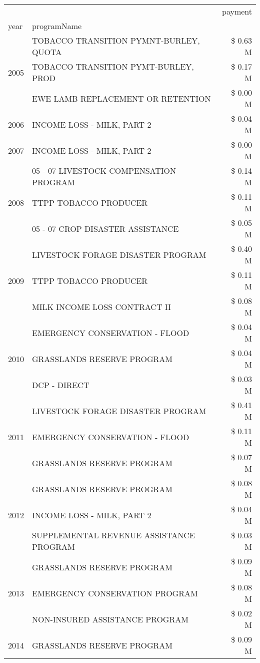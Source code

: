 \begin{tabular}{llr}
\toprule
 &  & payment \\
year & programName &  \\
\midrule
\multirow[t]{3}{*}{2005} & TOBACCO TRANSITION PYMNT-BURLEY, QUOTA & \$ 0.63 M \\
 & TOBACCO TRANSITION PYMT-BURLEY, PROD & \$ 0.17 M \\
 & EWE LAMB REPLACEMENT OR RETENTION & \$ 0.00 M \\
\cline{1-3}
2006 & INCOME LOSS - MILK, PART 2 & \$ 0.04 M \\
\cline{1-3}
2007 & INCOME LOSS - MILK, PART 2 & \$ 0.00 M \\
\cline{1-3}
\multirow[t]{3}{*}{2008} & 05 - 07 LIVESTOCK COMPENSATION PROGRAM & \$ 0.14 M \\
 & TTPP TOBACCO PRODUCER & \$ 0.11 M \\
 & 05 - 07 CROP DISASTER ASSISTANCE & \$ 0.05 M \\
\cline{1-3}
\multirow[t]{3}{*}{2009} & LIVESTOCK FORAGE DISASTER  PROGRAM & \$ 0.40 M \\
 & TTPP TOBACCO PRODUCER & \$ 0.11 M \\
 & MILK INCOME LOSS CONTRACT II & \$ 0.08 M \\
\cline{1-3}
\multirow[t]{3}{*}{2010} & EMERGENCY CONSERVATION - FLOOD & \$ 0.04 M \\
 & GRASSLANDS RESERVE PROGRAM & \$ 0.04 M \\
 & DCP - DIRECT & \$ 0.03 M \\
\cline{1-3}
\multirow[t]{3}{*}{2011} & LIVESTOCK FORAGE DISASTER PROGRAM & \$ 0.41 M \\
 & EMERGENCY CONSERVATION - FLOOD & \$ 0.11 M \\
 & GRASSLANDS RESERVE PROGRAM & \$ 0.07 M \\
\cline{1-3}
\multirow[t]{3}{*}{2012} & GRASSLANDS RESERVE PROGRAM & \$ 0.08 M \\
 & INCOME LOSS - MILK, PART 2 & \$ 0.04 M \\
 & SUPPLEMENTAL REVENUE ASSISTANCE PROGRAM & \$ 0.03 M \\
\cline{1-3}
\multirow[t]{3}{*}{2013} & GRASSLANDS RESERVE PROGRAM & \$ 0.09 M \\
 & EMERGENCY CONSERVATION PROGRAM & \$ 0.08 M \\
 & NON-INSURED ASSISTANCE PROGRAM & \$ 0.02 M \\
\cline{1-3}
\multirow[t]{3}{*}{2014} & GRASSLANDS RESERVE PROGRAM & \$ 0.09 M \\

\end{tabular}

